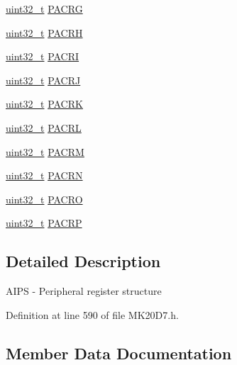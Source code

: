 \begin{DoxyCompactItemize}
\item 
\hyperlink{_p_e___types_8h_a33594304e786b158f3fb30289278f5af}{uint32\+\_\+t} \hyperlink{struct_a_i_p_s___mem_map_a7eb01b8a7f5cbdd90e2cfc1103dc818e}{P\+A\+C\+RG}
\item 
\hyperlink{_p_e___types_8h_a33594304e786b158f3fb30289278f5af}{uint32\+\_\+t} \hyperlink{struct_a_i_p_s___mem_map_af4ac7a20bb8f381f2f77e21ed14d5e91}{P\+A\+C\+RH}
\item 
\hyperlink{_p_e___types_8h_a33594304e786b158f3fb30289278f5af}{uint32\+\_\+t} \hyperlink{struct_a_i_p_s___mem_map_a75787ffd284dd47814093fbe8d28232d}{P\+A\+C\+RI}
\item 
\hyperlink{_p_e___types_8h_a33594304e786b158f3fb30289278f5af}{uint32\+\_\+t} \hyperlink{struct_a_i_p_s___mem_map_aa8170562fdbb48e8ade84f0992479a98}{P\+A\+C\+RJ}
\item 
\hyperlink{_p_e___types_8h_a33594304e786b158f3fb30289278f5af}{uint32\+\_\+t} \hyperlink{struct_a_i_p_s___mem_map_a62015f5d8f85dd001390b0168aa7389f}{P\+A\+C\+RK}
\item 
\hyperlink{_p_e___types_8h_a33594304e786b158f3fb30289278f5af}{uint32\+\_\+t} \hyperlink{struct_a_i_p_s___mem_map_a564d95efed1747932b25675342cac085}{P\+A\+C\+RL}
\item 
\hyperlink{_p_e___types_8h_a33594304e786b158f3fb30289278f5af}{uint32\+\_\+t} \hyperlink{struct_a_i_p_s___mem_map_a30e7ebe0ffb0e9d97cbfa85d65e17cbb}{P\+A\+C\+RM}
\item 
\hyperlink{_p_e___types_8h_a33594304e786b158f3fb30289278f5af}{uint32\+\_\+t} \hyperlink{struct_a_i_p_s___mem_map_a83bf08b950901b8f6d7ef2ceb960baa8}{P\+A\+C\+RN}
\item 
\hyperlink{_p_e___types_8h_a33594304e786b158f3fb30289278f5af}{uint32\+\_\+t} \hyperlink{struct_a_i_p_s___mem_map_a5892f2b025c43f875f1c88e3a8f6da30}{P\+A\+C\+RO}
\item 
\hyperlink{_p_e___types_8h_a33594304e786b158f3fb30289278f5af}{uint32\+\_\+t} \hyperlink{struct_a_i_p_s___mem_map_af6d96671be0c664042ec003595ac405e}{P\+A\+C\+RP}
\end{DoxyCompactItemize}


\subsection{Detailed Description}
A\+I\+PS -\/ Peripheral register structure 

Definition at line 590 of file M\+K20\+D7.\+h.



\subsection{Member Data Documentation}
